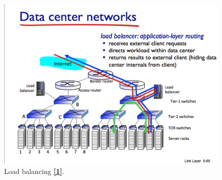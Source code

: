 \documentclass[a4paper,12pt]{article}
\begin{document}
\begin{figure}[H]
  \caption{Load balancing \hyperref[et]{\textbf{[1]}}.}
  \centering
    \includegraphics[width=1\textwidth]{Loadbalancing}
\end{figure}
\end{document}
